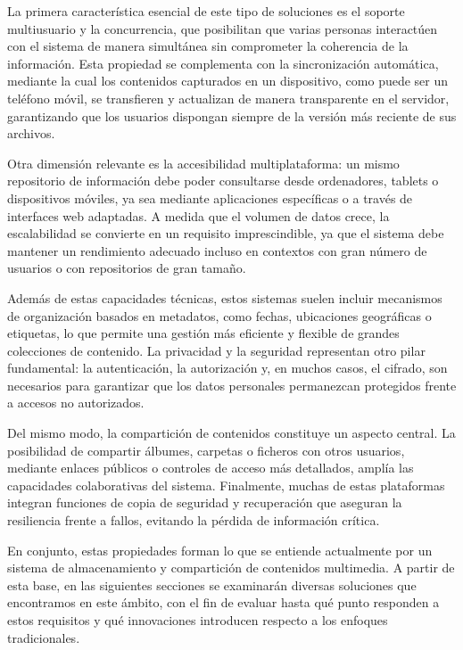La primera característica esencial de este tipo de soluciones es el soporte multiusuario y la concurrencia, que posibilitan que varias personas interactúen con el sistema de manera simultánea sin comprometer la coherencia de la información. Esta propiedad se complementa con la sincronización automática, mediante la cual los contenidos capturados en un dispositivo, como puede ser un teléfono móvil, se transfieren y actualizan de manera transparente en el servidor, garantizando que los usuarios dispongan siempre de la versión más reciente de sus archivos.

Otra dimensión relevante es la accesibilidad multiplataforma: un mismo repositorio de información debe poder consultarse desde ordenadores, tablets o dispositivos móviles, ya sea mediante aplicaciones específicas o a través de interfaces web adaptadas. A medida que el volumen de datos crece, la escalabilidad se convierte en un requisito imprescindible, ya que el sistema debe mantener un rendimiento adecuado incluso en contextos con gran número de usuarios o con repositorios de gran tamaño.

Además de estas capacidades técnicas, estos sistemas suelen incluir mecanismos de organización basados en metadatos, como fechas, ubicaciones geográficas o etiquetas, lo que permite una gestión más eficiente y flexible de grandes colecciones de contenido. La privacidad y la seguridad representan otro pilar fundamental: la autenticación, la autorización y, en muchos casos, el cifrado, son necesarios para garantizar que los datos personales permanezcan protegidos frente a accesos no autorizados. 

Del mismo modo, la compartición de contenidos constituye un aspecto central. La posibilidad de compartir álbumes, carpetas o ficheros con otros usuarios, mediante enlaces públicos o controles de acceso más detallados, amplía las capacidades colaborativas del sistema. Finalmente, muchas de estas plataformas integran funciones de copia de seguridad y recuperación que aseguran la resiliencia frente a fallos, evitando la pérdida de información crítica.

En conjunto, estas propiedades forman lo que se entiende actualmente por un sistema de almacenamiento y compartición de contenidos multimedia. A partir de esta base, en las siguientes secciones se examinarán diversas soluciones que encontramos en este ámbito, con el fin de evaluar hasta qué punto responden a estos requisitos y qué innovaciones introducen respecto a los enfoques tradicionales.

